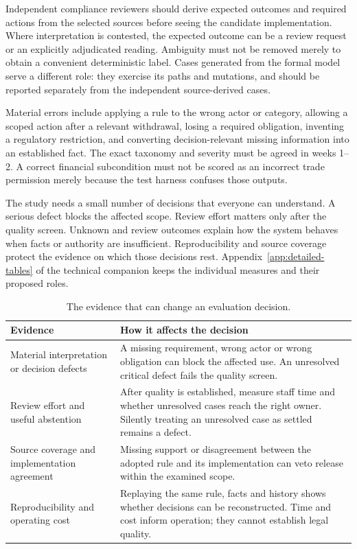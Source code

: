 Independent compliance reviewers should derive expected outcomes and required
actions from the selected sources before seeing the candidate implementation.
Where interpretation is contested, the expected outcome can be a review request
or an explicitly adjudicated reading. Ambiguity must not be removed merely to
obtain a convenient deterministic label. Cases generated from the formal model
serve a different role: they exercise its paths and mutations, and should be
reported separately from the independent source-derived cases.

Material errors include applying a rule to the wrong actor or category, allowing
a scoped action after a relevant withdrawal, losing a required obligation,
inventing a regulatory restriction, and converting decision-relevant missing
information into an established fact. The exact taxonomy and severity must be
agreed in weeks 1--2. A correct financial subcondition must not be scored as an
incorrect trade permission merely because the test harness confuses those outputs.


The study needs a small number of decisions that everyone can understand. A
serious defect blocks the affected scope. Review effort matters only after the
quality screen. Unknown and review outcomes explain how the system behaves when
facts or authority are insufficient. Reproducibility and source coverage protect
the evidence on which those decisions rest. Appendix~\ref{app:detailed-tables} of the technical companion
keeps the individual measures and their proposed roles.

\begin{table}[H]
\centering
\caption{The evidence that can change an evaluation decision.}
\label{tab:evaluation}
\begin{tabularx}{\textwidth}{P{48mm}Y}
\toprule
Evidence & How it affects the decision\\
\midrule
Material interpretation or decision defects & A missing requirement, wrong actor or wrong obligation can block the affected use. An unresolved critical defect fails the quality screen.\\
\addlinespace[0.5em]
Review effort and useful abstention & After quality is established, measure staff time and whether unresolved cases reach the right owner. Silently treating an unresolved case as settled remains a defect.\\
\addlinespace[0.5em]
Source coverage and implementation agreement & Missing support or disagreement between the adopted rule and its implementation can veto release within the examined scope.\\
\addlinespace[0.5em]
Reproducibility and operating cost & Replaying the same rule, facts and history shows whether decisions can be reconstructed. Time and cost inform operation; they cannot establish legal quality.\\
\bottomrule
\end{tabularx}
\end{table}

